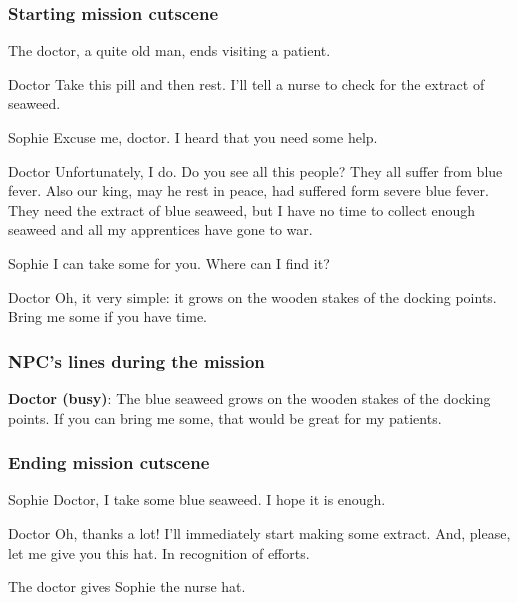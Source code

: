 \subsubsection*{Starting mission cutscene}
\begin{screenplay}

The doctor, a quite old man, ends visiting a patient.

\begin{dialogue}{Doctor}
Take this pill and then rest. I'll tell a nurse to check for the extract of seaweed.
\end{dialogue}

\begin{dialogue}{Sophie}
Excuse me, doctor. I heard that you need some help.
\end{dialogue}

\begin{dialogue}{Doctor}
Unfortunately, I do. Do you see all this people? They all suffer from blue fever. Also our king, may he rest in peace, had suffered form severe blue fever. They need the extract of blue seaweed, but I have no time to collect enough seaweed and all my apprentices have gone to war.
\end{dialogue}

\begin{dialogue}{Sophie}
I can take some for you. Where can I find it?
\end{dialogue}

\begin{dialogue}{Doctor}
Oh, it very simple: it grows on the wooden stakes of the docking points. Bring me some if you have time.
\end{dialogue}

\end{screenplay}

\subsubsection*{NPC's lines during the mission}
\textbf{Doctor (busy)}: The blue seaweed grows on the wooden stakes of the docking points. If you can bring me some, that would be great for my patients.

\subsubsection*{Ending mission cutscene}
\begin{screenplay}

\begin{dialogue}{Sophie}
Doctor, I take some blue seaweed. I hope it is enough.
\end{dialogue}

\begin{dialogue}{Doctor}
Oh, thanks a lot! I'll immediately start making some extract. And, please, let me give you this hat. In recognition of efforts.
\end{dialogue}

The doctor gives Sophie the nurse hat.

\end{screenplay}


